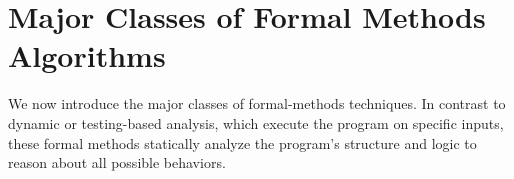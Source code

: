 \documentclass[oneside,11pt,dvipsnames]{book}
\numberwithin{equation}{section}
\theoremstyle{definition}
\theoremstyle{remark}
\begin{document}



















\section{Major Classes of Formal Methods Algorithms}\label{sec:fm-techniques}


We now introduce the major classes of formal-methods techniques. In contrast to dynamic or testing-based analysis, which execute the program on specific inputs, these formal methods statically analyze the program's structure and logic to reason about all possible behaviors.
\end{document}
